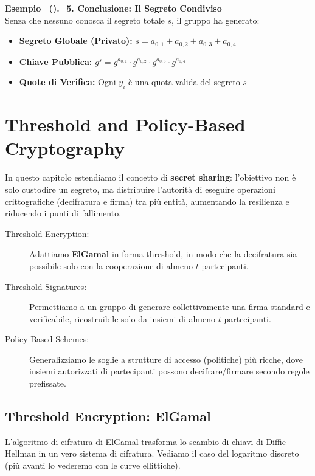 \documentclass[a4paper, 11pt]{article}
\newenvironment{example}[1][]{
  \par\noindent\textbf{Esempio%
  \if\relax\detokenize{#1}\relax\else\ (\textbf{#1})\fi.}\ }{}
\begin{document}
\begin{example}
    \textbf{5. Conclusione: Il Segreto Condiviso} \\
    Senza che nessuno conosca il segreto totale $s$, il gruppo ha generato:
    \begin{itemize}
        \item \textbf{Segreto Globale (Privato):} $s = a_{0,1} + a_{0,2} + a_{0,3} + a_{0,4}$
        \item \textbf{Chiave Pubblica:} $g^s = g^{a_{0,1}} \cdot g^{a_{0,2}} \cdot g^{a_{0,3}} \cdot g^{a_{0,4}}$
        \item \textbf{Quote di Verifica:} Ogni $y_i$ è una quota valida del segreto $s$
    \end{itemize}
\end{example}

\newpage

\section{Threshold and Policy-Based Cryptography}

In questo capitolo estendiamo il concetto di \textbf{secret sharing}: l'obiettivo non è solo custodire un segreto, ma distribuire l'autorità di eseguire operazioni crittografiche (decifratura e firma) tra più entità, aumentando la resilienza e riducendo i punti di fallimento.
\begin{description}
    \item[Threshold Encryption:] Adattiamo \textbf{ElGamal} in forma threshold, in modo che la decifratura sia possibile solo con la cooperazione di almeno $t$ partecipanti.
    \item[Threshold Signatures:] Permettiamo a un gruppo di generare collettivamente una firma standard e verificabile, ricostruibile solo da insiemi di almeno $t$ partecipanti.
    \item[Policy-Based Schemes:] Generalizziamo le soglie a strutture di accesso (politiche) più ricche, dove insiemi autorizzati di partecipanti possono decifrare/firmare secondo regole prefissate.
\end{description}

\subsection{Threshold Encryption: ElGamal}

L'algoritmo di cifratura di ElGamal trasforma lo scambio di chiavi di Diffie-Hellman in un vero sistema di cifratura. Vediamo il caso del logaritmo discreto (più avanti lo vederemo con le curve ellittiche).
\end{document}
